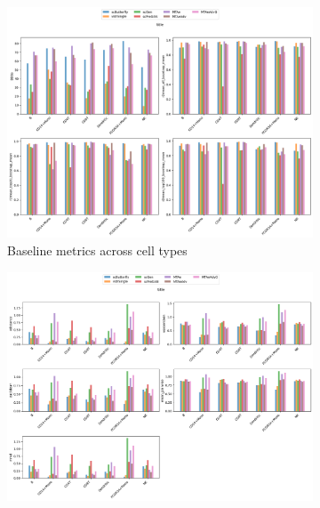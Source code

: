\documentclass[12pt, a4paper]{article}
\begin{document}

\begin{figure}[h!]
    \centering
    \begin{subfigure}[t]{0.42\textwidth}
        \centering
        \includegraphics[width=\textwidth]{selected_benchmarking_cell_type_baseline_metrics_pbmc.png}
        \caption{Baseline metrics across cell types}
        \label{}
    \end{subfigure}
    \hfill
    \begin{subfigure}[t]{0.42\textwidth}
        \centering
        \includegraphics[width=\textwidth]{selected_benchmarking_cell_type_distance_metrics_pbmc.png}

\end{subfigure}
\end{figure}
\end{document}
